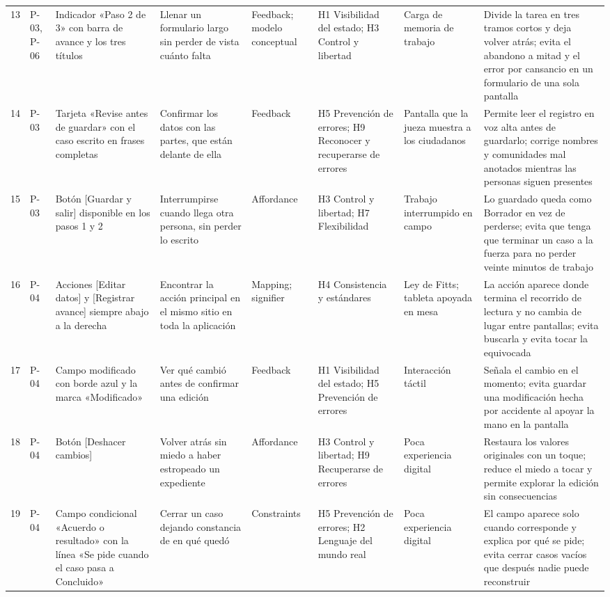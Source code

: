 \begin{longtable}{@{}p{0.6cm}p{1.5cm}p{3.6cm}p{3.4cm}p{2.2cm}p{2.8cm}p{2.3cm}p{4.6cm}@{}}
13 & P-03, P-06 & Indicador «Paso 2 de 3» con barra de avance y los tres títulos & Llenar un formulario largo sin perder de vista cuánto falta & Feedback; modelo conceptual & H1 Visibilidad del estado; H3 Control y libertad & Carga de memoria de trabajo & Divide la tarea en tres tramos cortos y deja volver atrás; evita el abandono a mitad y el error por cansancio en un formulario de una sola pantalla \\
14 & P-03 & Tarjeta «Revise antes de guardar» con el caso escrito en frases completas & Confirmar los datos con las partes, que están delante de ella & Feedback & H5 Prevención de errores; H9 Reconocer y recuperarse de errores & Pantalla que la jueza muestra a los ciudadanos & Permite leer el registro en voz alta antes de guardarlo; corrige nombres y comunidades mal anotados mientras las personas siguen presentes \\
15 & P-03 & Botón [Guardar y salir] disponible en los pasos 1 y 2 & Interrumpirse cuando llega otra persona, sin perder lo escrito & Affordance & H3 Control y libertad; H7 Flexibilidad & Trabajo interrumpido en campo & Lo guardado queda como Borrador en vez de perderse; evita que tenga que terminar un caso a la fuerza para no perder veinte minutos de trabajo \\
16 & P-04 & Acciones [Editar datos] y [Registrar avance] siempre abajo a la derecha & Encontrar la acción principal en el mismo sitio en toda la aplicación & Mapping; signifier & H4 Consistencia y estándares & Ley de Fitts; tableta apoyada en mesa & La acción aparece donde termina el recorrido de lectura y no cambia de lugar entre pantallas; evita buscarla y evita tocar la equivocada \\
17 & P-04 & Campo modificado con borde azul y la marca «Modificado» & Ver qué cambió antes de confirmar una edición & Feedback & H1 Visibilidad del estado; H5 Prevención de errores & Interacción táctil & Señala el cambio en el momento; evita guardar una modificación hecha por accidente al apoyar la mano en la pantalla \\
18 & P-04 & Botón [Deshacer cambios] & Volver atrás sin miedo a haber estropeado un expediente & Affordance & H3 Control y libertad; H9 Recuperarse de errores & Poca experiencia digital & Restaura los valores originales con un toque; reduce el miedo a tocar y permite explorar la edición sin consecuencias \\
19 & P-04 & Campo condicional «Acuerdo o resultado» con la línea «Se pide cuando el caso pasa a Concluido» & Cerrar un caso dejando constancia de en qué quedó & Constraints & H5 Prevención de errores; H2 Lenguaje del mundo real & Poca experiencia digital & El campo aparece solo cuando corresponde y explica por qué se pide; evita cerrar casos vacíos que después nadie puede reconstruir \\

\end{longtable}
